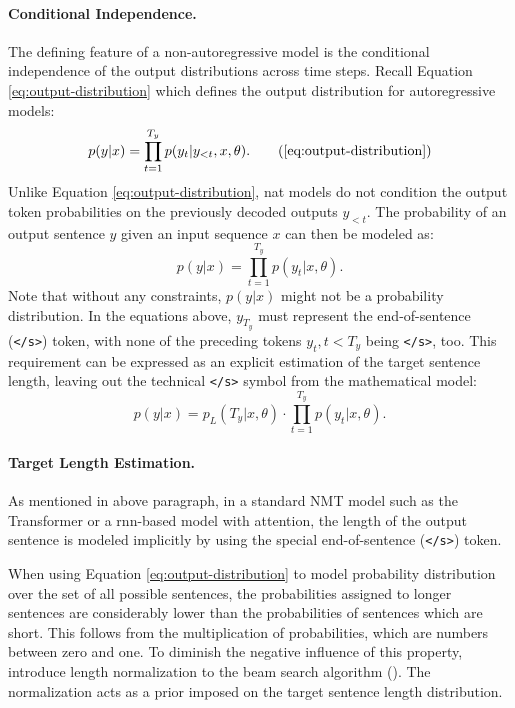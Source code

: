 \paragraph{Conditional Independence.} The defining feature of a
non-autoregressive model is the conditional independence of the output
distributions across time steps. Recall Equation \ref{eq:output-distribution}
which defines the output distribution for autoregressive models:
%
\begin{equation}
  p(y|x) = \prod_{t=1}^{T_y}p(y_t|y_{<t},x,\theta).
  \tag{\ref{eq:output-distribution}}
\end{equation}
%
Unlike Equation \ref{eq:output-distribution}, \Gls{nat} models do not condition
the output token probabilities on the previously decoded outputs $y_{<t}$.  The
probability of an output sentence $y$ given an input sequence $x$ can then be
modeled as:
%
\begin{equation}
  p(y|x) = \prod_{t=1}^{T_y}p(y_t|x,\theta).
  \label{eq:nat-output-distribution}
\end{equation}
%
Note that without any constraints, $p(y|x)$ might not be a probability
distribution. In the equations above, $y_{T_y}$ must represent the
end-of-sentence (\texttt{</s>}) token, with none of the preceding tokens
$y_t, t < T_y$ being \texttt{</s>}, too. This requirement can be expressed as an
explicit estimation of the target sentence length, leaving out the technical
\texttt{</s>} symbol from the mathematical model:
\begin{equation}
  p(y|x) = p_L(T_y|x, \theta) \cdot \prod_{t=1}^{T_y}p(y_t|x,\theta).
  \label{eq:explicit-length}
\end{equation}

\paragraph{Target Length Estimation.} As mentioned in above paragraph, in a
standard NMT model such as the Transformer or a \gls{rnn}-based model with
attention, the length of the output sentence is modeled implicitly by using the
special end-of-sentence (\texttt{</s>}) token. 

When using Equation \ref{eq:output-distribution} to model probability
distribution over the set of all possible sentences, the probabilities assigned
to longer sentences are considerably lower than the probabilities of sentences
which are short. This follows from the multiplication of probabilities, which
are numbers between zero and one.    To diminish the negative influence of this property,
\citet{wu2016google} introduce length normalization to the beam search algorithm
(). The normalization acts as a prior imposed
on the target sentence length distribution.

